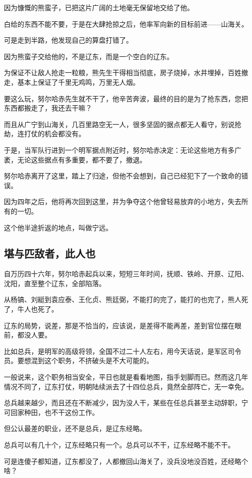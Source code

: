 \begin{multicols}{\theparacolNo}
因为慷慨的熊蛮子，已把这片广阔的土地毫无保留地交给了他。

白给的东西不能不要，于是在大肆抢掠之后，他率军向新的目标前进——山海关。

可是走到半路，他发现自己的算盘打错了。

因为熊蛮子交给他的，不是辽东，而是一个空白的辽东。

为保证不让敌人抢走一粒粮，熊先生干得相当彻底，房子烧掉，水井埋掉，百姓撤走，基本上保证了千里无鸡鸣，万里无人烟。

要这么玩，努尔哈赤先生就不干了，他辛苦奔波，最终的目的是为了抢东西，您把东西都搬走了，我还去干嘛？

而且从广宁到山海关，几百里路空无一人，很多坚固的据点都无人看守，别说抢劫，连打仗的机会都没有。

于是，当军队行进到一个明军据点附近时，努尔哈赤决定：无论这些地方有多广袤，无论这些据点有多重要，都不要了，撤退。

努尔哈赤离开了这里，踏上了归途，但他不会想到，自己已经犯下了一个致命的错误。

因为四年之后，他将再次回到这里，并为争夺这个他曾轻易放弃的小地方，失去所有的一切。

这个他半途折返的地点，叫做宁远。

\subsection{堪与匹敌者，此人也}
自万历四十六年，努尔哈赤起兵以来，短短三年时间，抚顺、铁岭、开原、辽阳、沈阳，直至整个辽东，全部陷落。

从杨镐、刘綎到袁应泰、王化贞、熊廷弼，不能打的完了，能打的也完了，熊人死了，牛人也死了。

辽东的局势，说差，那是不恰当的，应该说，是差得不能再差，差到官位摆在眼前，都没人要。

比如总兵，是明军的高级将领，全国不过二十人左右，用今天话说，是军区司令员。要想混到这个职务，不挤破头是不大可能的。

一般说来，这个职务相当安全，平日也就是看看地图，指手划脚而已。然而这几年情况不同了，辽东打仗，明朝陆续派去了十四位总兵，竟然全部阵亡，无一幸免。

总兵越来越少，而且还在不断减少，因为没人干，某些在任总兵甚至主动辞职，宁可回家种田，也不干这份工作。

但公认最差的职业，还不是总兵，是辽东经略。

总兵可以有几十个，辽东经略只有一个。总兵可以不干，辽东经略不能不干。

可是连傻子都知道，辽东都没了，人都撤回山海关了，没兵没地没百姓，还经略个啥？


\end{multicols}
